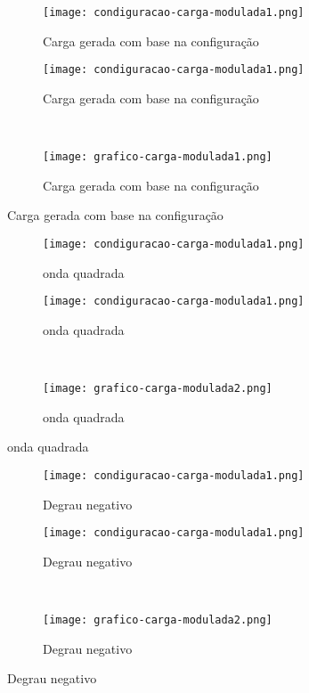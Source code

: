 \begin{figure}[!htb]
	\begin{subfigure}{.5\linewidth}
		\centering
		\texttt{[image: condiguracao-carga-modulada1.png]}
		\caption{Carga gerada com base na configuração}
		\label{fig:sub1}
	\end{subfigure}%
	\begin{subfigure}{.5\linewidth}
		\centering
		\texttt{[image: condiguracao-carga-modulada1.png]}
		\caption{Carga gerada com base na configuração}
		\label{fig:sub2}
	\end{subfigure}\\[1ex]
	\begin{subfigure}{\linewidth}
		\centering
		\texttt{[image: grafico-carga-modulada1.png]}
		\caption{Carga gerada com base na configuração}
		\label{fig:grafico-carga-modulada}
	\end{subfigure}
	\caption{Carga gerada com base na configuração}
	\label{fig:test}
	\fautor
\end{figure}



\begin{figure}[!htb]
	\begin{subfigure}{.5\linewidth}
		\centering
		\texttt{[image: condiguracao-carga-modulada1.png]}
		\caption{onda quadrada}
		\label{fig:sub1}
	\end{subfigure}%
	\begin{subfigure}{.5\linewidth}
		\centering
		\texttt{[image: condiguracao-carga-modulada1.png]}
		\caption{onda quadrada}
		\label{fig:sub2}
	\end{subfigure}\\[1ex]
	\begin{subfigure}{\linewidth}
		\centering
		\texttt{[image: grafico-carga-modulada2.png]}
		\caption{onda quadrada}
		\label{fig:grafico-carga-modulada}
	\end{subfigure}
	\caption{onda quadrada}
	\label{fig:test}
	\fautor
\end{figure}

\begin{figure}[!htb]
	\begin{subfigure}{.5\linewidth}
		\centering
		\texttt{[image: condiguracao-carga-modulada1.png]}
		\caption{Degrau negativo}
		\label{fig:sub1}
	\end{subfigure}%
	\begin{subfigure}{.5\linewidth}
		\centering
		\texttt{[image: condiguracao-carga-modulada1.png]}
		\caption{Degrau negativo}
		\label{fig:sub2}
	\end{subfigure}\\[1ex]
	\begin{subfigure}{\linewidth}
		\centering
		\texttt{[image: grafico-carga-modulada2.png]}
		\caption{Degrau negativo}
		\label{fig:grafico-carga-modulada}
	\end{subfigure}
	\caption{Degrau negativo}
	\label{fig:test}
	\fautor
\end{figure}


